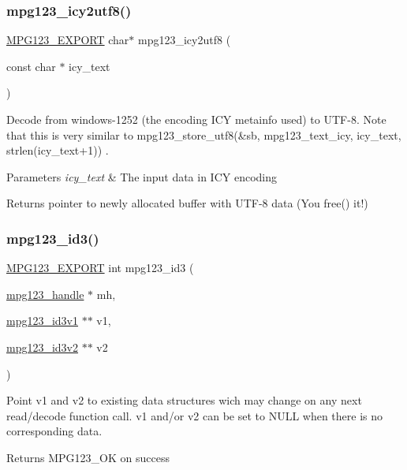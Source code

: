 \subsubsection{\texorpdfstring{mpg123\_icy2utf8()}{mpg123\_icy2utf8()}}
{\footnotesize\ttfamily \mbox{\hyperlink{mpg123_8h_a2ba98cfba3f760879df70e755b2a61cc}{M\+P\+G123\+\_\+\+E\+X\+P\+O\+RT}} char$\ast$ mpg123\+\_\+icy2utf8 (\begin{DoxyParamCaption}\item[{const char $\ast$}]{icy\+\_\+text }\end{DoxyParamCaption})}

Decode from windows-\/1252 (the encoding I\+CY metainfo used) to U\+T\+F-\/8. Note that this is very similar to mpg123\+\_\+store\+\_\+utf8(\&sb, mpg123\+\_\+text\+\_\+icy, icy\+\_\+text, strlen(icy\+\_\+text+1)) . 
\begin{DoxyParams}{Parameters}
{\em icy\+\_\+text} & The input data in I\+CY encoding \\
\hline
\end{DoxyParams}
\begin{DoxyReturn}{Returns}
pointer to newly allocated buffer with U\+T\+F-\/8 data (You free() it!) 
\end{DoxyReturn}
\mbox{\label{group__mpg123__metadata_ga8352786015f8ff33c7d1fe8a4d979c88}} 
\subsubsection{\texorpdfstring{mpg123\_id3()}{mpg123\_id3()}}
{\footnotesize\ttfamily \mbox{\hyperlink{mpg123_8h_a2ba98cfba3f760879df70e755b2a61cc}{M\+P\+G123\+\_\+\+E\+X\+P\+O\+RT}} int mpg123\+\_\+id3 (\begin{DoxyParamCaption}\item[{\mbox{\hyperlink{group__mpg123__init_ga6728e2839a395f3a07d4514da659faca}{mpg123\+\_\+handle}} $\ast$}]{mh,  }\item[{\mbox{\hyperlink{structmpg123__id3v1}{mpg123\+\_\+id3v1}} $\ast$$\ast$}]{v1,  }\item[{\mbox{\hyperlink{structmpg123__id3v2}{mpg123\+\_\+id3v2}} $\ast$$\ast$}]{v2 }\end{DoxyParamCaption})}

Point v1 and v2 to existing data structures wich may change on any next read/decode function call. v1 and/or v2 can be set to N\+U\+LL when there is no corresponding data. \begin{DoxyReturn}{Returns}
M\+P\+G123\+\_\+\+OK on success 
\end{DoxyReturn}
\mbox{\label{group__mpg123__metadata_gaf0206ccb2574f563bff863a26a3b0025}} 
